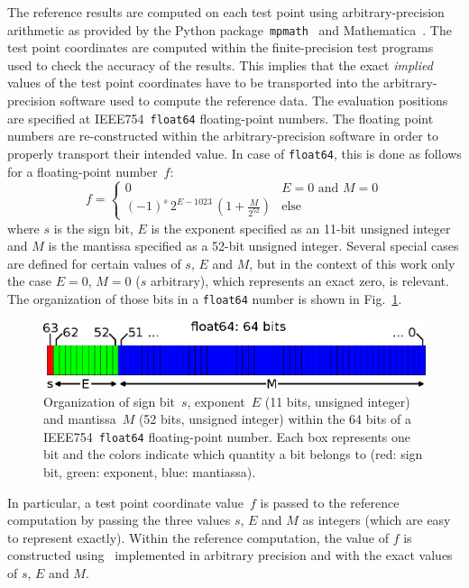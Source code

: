 The reference results are computed on each test point using arbitrary-precision arithmetic
as provided by the Python package~\texttt{mpmath}~\cite{mpmath} and Mathematica~\cite{Mathematica}.
The test point coordinates are computed within the finite-precision test programs used to check the accuracy of the results.
This implies that the exact \textit{implied} values of the test point coordinates have to be transported
into the arbitrary-precision software used to compute the reference data.
The evaluation positions are specified at IEEE754~\texttt{float64} floating-point numbers.
The floating point numbers are re-constructed within the arbitrary-precision software
in order to properly transport their intended value.
In case of \texttt{float64}, this is done as follows for a floating-point number~$f$:
\begin{equation}
 f = \begin{cases}
      0                                                             & E=0 \textrm{ and } M=0 \\
      (-1)^s \, 2^{E - 1023} \, \left( 1 + \frac{M}{2^{52}} \right) & \textrm{else}
     \end{cases}
     \label{eqn:float64}
\end{equation}
where $s$ is the sign bit, $E$ is the exponent specified as an 11-bit unsigned integer
and $M$ is the mantissa specified as a 52-bit unsigned integer.
Several special cases are defined for certain values of $s$, $E$ and $M$,
but in the context of this work only the case $E=0$, $M=0$ ($s$ arbitrary),
which represents an exact zero, is relevant.
The organization of those bits in a \texttt{float64} number is shown in Fig.~\ref{fig:float64}.
\begin{figure}[htbp]
 \centering
 \includegraphics{img/IEEE754_float64.eps}
 \caption{Organization of sign bit~$s$, exponent~$E$ (11 bits, unsigned integer)
          and mantissa~$M$ (52 bits, unsigned integer) within the 64 bits
          of a IEEE754~\texttt{float64} floating-point number.
          Each box represents one bit and the colors indicate which quantity a bit belongs to
          (red: sign bit, green: exponent, blue: mantiassa).}
 \label{fig:float64}
\end{figure}
In particular, a test point coordinate value~$f$ is passed to the reference computation
by passing the three values $s$, $E$ and $M$ as integers (which are easy to represent exactly).
Within the reference computation, the value of $f$ is constructed using~ implemented
in arbitrary precision and with the exact values of $s$, $E$ and $M$.


